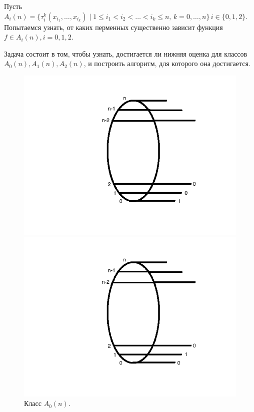 \documentclass[oneside, final, 14pt]{extreport}
\begin{document}
    Пусть $A_i(n) = \{\tau_i^k(x_{i_1}, \ldots, x_{i_k}) \mid 1 \leq i_1 < i_2 < \ldots < i_k \leq n, \, k=0,\ldots, n\} \,  i \in \{0, 1, 2\}.$
	Попытаемся  узнать, от каких перменных существенно зависит функция $f \in A_i(n), i = 0, 1, 2$.
	
	\noindent Задача состоит в том, чтобы узнать, достигается ли нижняя оценка для классов $A_0(n), A_1(n), A_2(n)$, и построить алгоритм, для которого она 
	достигается.

 \begin{figure}[h]
 	\begin{center}
 		\begin{minipage}[h]{0.3\linewidth}
 			\includegraphics[width=1\linewidth]{A0}
 			\caption{Класс $A_0(n)$.} %
 			\label{ris:A0} %
 		\end{minipage}
 		\hfill 
 		\begin{minipage}[h]{0.3\linewidth}
 			\includegraphics[width=1\linewidth]{A1}

\end{minipage}
\end{center}
\end{figure}
\end{document}
